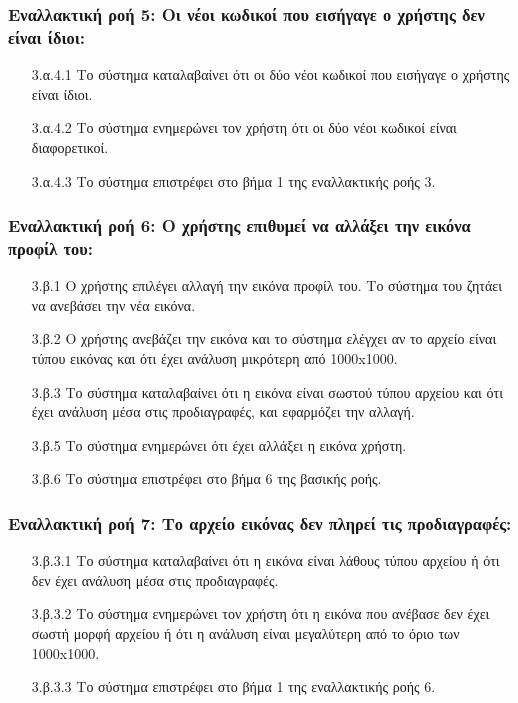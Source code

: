 \documentclass[12pt,a4paper]{article}
\begin{document}
\subsubsection*{Εναλλακτική ροή 5: Οι νέοι κωδικοί που εισήγαγε ο χρήστης δεν είναι ίδιοι:}
\begin{enumerate}
    \item [3.α.4.1] Το σύστημα καταλαβαίνει ότι οι δύο νέοι κωδικοί που εισήγαγε ο χρήστης είναι ίδιοι.
    \item [3.α.4.2] Το σύστημα ενημερώνει τον χρήστη ότι οι δύο νέοι κωδικοί είναι διαφορετικοί.
    \item [3.α.4.3] Το σύστημα επιστρέφει στο βήμα 1 της εναλλακτικής ροής 3.
\end{enumerate}

\subsubsection*{Εναλλακτική ροή 6: Ο χρήστης επιθυμεί να αλλάξει την εικόνα προφίλ του:}
\begin{enumerate}
    \item [3.β.1] Ο χρήστης επιλέγει αλλαγή την εικόνα προφίλ του. Το σύστημα του ζητάει να ανεβάσει την νέα εικόνα.
    \item [3.β.2] Ο χρήστης ανεβάζει την εικόνα και το σύστημα ελέγχει αν το αρχείο είναι τύπου εικόνας και ότι έχει ανάλυση μικρότερη από 1000x1000.
    \item [3.β.3] Το σύστημα καταλαβαίνει ότι η εικόνα είναι σωστού τύπου αρχείου και ότι έχει ανάλυση μέσα στις προδιαγραφές, και εφαρμόζει την αλλαγή.
    \item [3.β.5] Το σύστημα ενημερώνει ότι έχει αλλάξει η εικόνα χρήστη.
    \item [3.β.6] Το σύστημα επιστρέφει στο βήμα 6 της βασικής ροής.
\end{enumerate}

\subsubsection*{Εναλλακτική ροή 7: Το αρχείο εικόνας δεν πληρεί τις προδιαγραφές:}
\begin{enumerate}
    \item [3.β.3.1] Το σύστημα καταλαβαίνει ότι η εικόνα είναι λάθους τύπου αρχείου ή ότι δεν έχει ανάλυση μέσα στις προδιαγραφές.
    \item [3.β.3.2] Το σύστημα ενημερώνει τον χρήστη ότι η εικόνα που ανέβασε δεν έχει σωστή μορφή αρχείου ή ότι η ανάλυση είναι μεγαλύτερη από το όριο των 1000x1000.
    \item [3.β.3.3] Το σύστημα επιστρέφει στο βήμα 1 της εναλλακτικής ροής 6.
\end{enumerate}
\end{document}
